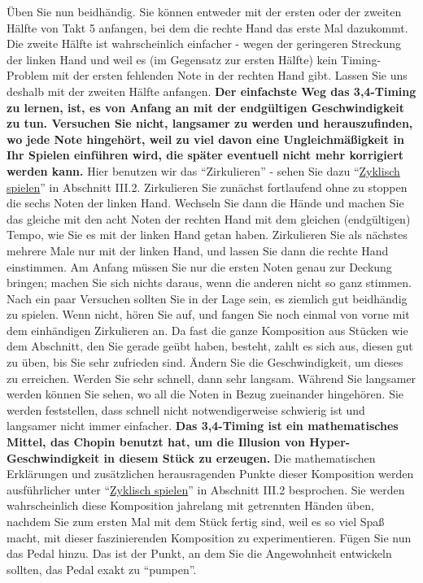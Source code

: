 Üben Sie nun beidhändig.
Sie können entweder mit der ersten oder der zweiten Hälfte von Takt 5 anfangen, bei dem die rechte Hand das erste Mal dazukommt.
Die zweite Hälfte ist wahrscheinlich einfacher - wegen der geringeren Streckung der linken Hand und weil es (im Gegensatz zur ersten Hälfte) kein Timing-Problem mit der ersten fehlenden Note in der rechten Hand gibt.
Lassen Sie uns deshalb mit der zweiten Hälfte anfangen.
\textbf{Der einfachste Weg das 3,4-Timing zu lernen, ist, es von Anfang an mit der endgültigen Geschwindigkeit zu tun.
Versuchen Sie nicht, langsamer zu werden und herauszufinden, wo jede Note hingehört, weil zu viel davon eine Ungleichmäßigkeit in Ihr Spielen einführen wird, die später eventuell nicht mehr korrigiert werden kann.}
Hier benutzen wir das \enquote{Zirkulieren} - sehen Sie dazu \enquote{\hyperlink{c1iii2}{Zyklisch spielen}} in Abschnitt III.2.
Zirkulieren Sie zunächst fortlaufend ohne zu stoppen die sechs Noten der linken Hand.
Wechseln Sie dann die Hände und machen Sie das gleiche mit den acht Noten der rechten Hand mit dem gleichen (endgültigen) Tempo, wie Sie es mit der linken Hand getan haben.
Zirkulieren Sie als nächstes mehrere Male nur mit der linken Hand, und lassen Sie dann die rechte Hand einstimmen.
Am Anfang müssen Sie nur die ersten Noten genau zur Deckung bringen; machen Sie sich nichts daraus, wenn die anderen nicht so ganz stimmen.
Nach ein paar Versuchen sollten Sie in der Lage sein, es ziemlich gut beidhändig zu spielen.
Wenn nicht, hören Sie auf, und fangen Sie noch einmal von vorne mit dem einhändigen Zirkulieren an.
Da fast die ganze Komposition aus Stücken wie dem Abschnitt, den Sie gerade geübt haben, besteht, zahlt es sich aus, diesen gut zu üben, bis Sie sehr zufrieden sind.
Ändern Sie die Geschwindigkeit, um dieses zu erreichen.
Werden Sie sehr schnell, dann sehr langsam.
Während Sie langsamer werden können Sie sehen, wo all die Noten in Bezug zueinander hingehören.
Sie werden feststellen, dass schnell nicht notwendigerweise schwierig ist und langsamer nicht immer einfacher.
\textbf{Das 3,4-Timing ist ein mathematisches Mittel, das Chopin benutzt hat, um die Illusion von Hyper-Geschwindigkeit in diesem Stück zu erzeugen.}
Die mathematischen Erklärungen und zusätzlichen herausragenden Punkte dieser Komposition werden ausführlicher unter \enquote{\hyperlink{c1iii2}{Zyklisch spielen}} in Abschnitt III.2 besprochen.
Sie werden wahrscheinlich diese Komposition jahrelang mit getrennten Händen üben, nachdem Sie zum ersten Mal mit dem Stück fertig sind, weil es so viel Spaß macht, mit dieser faszinierenden Komposition zu experimentieren.
Fügen Sie nun das Pedal hinzu.
Das ist der Punkt, an dem Sie die Angewohnheit entwickeln sollten, das Pedal exakt zu \enquote{pumpen}.

